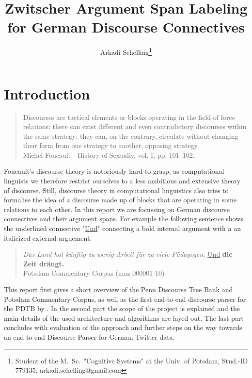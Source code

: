 \documentclass[10pt,a4paper]{article}
\author{Arkadi Schelling\footnote{Student of the M.~Sc.~"Cognitive Systems" at the Univ. of Potsdam, Stud.-ID 779135, arkadi.schelling@gmail.com}}
\title{Zwitscher\linebreak
	\normalsize Argument Span Labeling for German Discourse Connectives}
\begin{document}
\lstset{basicstyle=\footnotesize, breaklines=true, language=Python} %
\maketitle
\hfill
\tableofcontents %
\pagebreak

\section{Introduction}

\begin{quote}
Discourses are tactical elements or blocks operating in the field of force relations; there can exist different and even contradictory discourses within the same strategy; they can, on the contrary, circulate without changing their form from one strategy to another, opposing strategy.\\
\quad Michel Foucault - History of Sexualiy, vol. I, pp. 101--102.
\end{quote}

Foucault's discourse theory is notoriously hard to grasp, as computational linguists we therefore restrict ourselves to a less ambitious and extensive theory of discourse. Still, discourse theory in computational linguistics also tries to formalise the idea of a discourse made up of blocks that are operating in some relations to each other. In this report we are focussing on German discourse connectives and their argument spans. For example the following sentence shows the underlined connective "\underline{Und}" connecting a bold internal argument with a an italicized external arguement.

\begin{quote}\label{PCCquote}
\textit{Das Land hat künftig zu wenig Arbeit für zu viele Pädagogen.} \underline{Und} \textbf{die Zeit drängt.}\\
\quad Potsdam Commentary Corpus (maz-000001-10)
\end{quote}

This report first gives a short overview of the Penn Discourse Tree Bank and Potsdam Commentary Corpus, as well as the first end-to-end discourse parser for the PDTB by \cite{Lin12}.
In the second part the scope of the project is explained and the main details of the used architecture and algorithms are layed out. The last part concludes with evaluation of the approach and further steps on the way towards an end-to-end Discourse Parser for German Twitter data.
\end{document}
